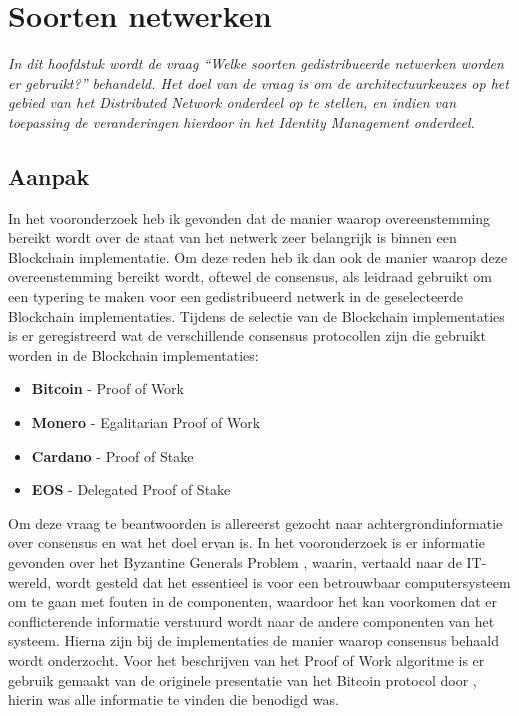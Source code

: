 \section{Soorten netwerken}

\textit{In dit hoofdstuk wordt de vraag ``Welke soorten gedistribueerde netwerken worden er gebruikt?'' behandeld. Het doel van de vraag is om de architectuurkeuzes op het gebied van het Distributed Network onderdeel op te stellen, en indien van toepassing de veranderingen hierdoor in het Identity Management onderdeel.}


\subsection{Aanpak}

In het vooronderzoek heb ik gevonden dat de manier waarop overeenstemming bereikt wordt over de staat van het netwerk zeer belangrijk is binnen een Blockchain implementatie. Om deze reden heb ik dan ook de manier waarop deze overeenstemming bereikt wordt, oftewel de consensus, als leidraad gebruikt om een typering te maken voor een gedistribueerd netwerk in de geselecteerde Blockchain implementaties. Tijdens de selectie van de Blockchain implementaties is er geregistreerd wat de verschillende consensus protocollen zijn die gebruikt worden in de Blockchain implementaties:

\begin{itemize}[noitemsep]
  \item \textbf{Bitcoin} - Proof of Work
  \item \textbf{Monero} - Egalitarian Proof of Work
  \item \textbf{Cardano} - Proof of Stake
  \item \textbf{EOS} - Delegated Proof of Stake
\end{itemize}

Om deze vraag te beantwoorden is allereerst gezocht naar achtergrondinformatie over consensus en wat het doel ervan is. In het vooronderzoek is er informatie gevonden over het Byzantine Generals Problem \citep{lamport1982byzantine}, waarin, vertaald naar de IT-wereld, wordt gesteld dat het essentieel is voor een betrouwbaar computersysteem om te gaan met fouten in de componenten, waardoor het kan voorkomen dat er conflicterende informatie verstuurd wordt naar de andere componenten van het systeem. Hierna zijn bij de implementaties de manier waarop consensus behaald wordt onderzocht. Voor het beschrijven van het Proof of Work algoritme is er gebruik gemaakt van de originele presentatie van het Bitcoin protocol door \cite{nakamoto2008bitcoin}, hierin was alle informatie te vinden die benodigd was. 

